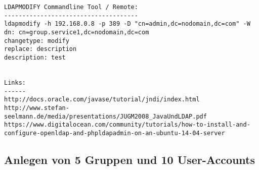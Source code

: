 \documentclass[letterpaper, 12pt]{article}
\let\tempsubsection\subsection
\renewcommand\subsection[1]{\vspace{0cm}\tempsubsection{#1}\vspace{0cm}}
\begin{document}
\newpage
\begin{lstlisting}[frame=single, caption=Grundkonfiguration]
LDAPMODIFY Commandline Tool / Remote:
-------------------------------------
ldapmodify -h 192.168.0.8 -p 389 -D "cn=admin,dc=nodomain,dc=com" -W  
dn: cn=group.service1,dc=nodomain,dc=com             
changetype: modify
replace: description
description: test


Links:
------
http://docs.oracle.com/javase/tutorial/jndi/index.html
http://www.stefan-seelmann.de/media/presentations/JUGM2008_JavaUndLDAP.pdf
https://www.digitalocean.com/community/tutorials/how-to-install-and-configure-openldap-and-phpldapadmin-on-an-ubuntu-14-04-server
\end{lstlisting}

\subsection{Anlegen von 5 Gruppen und 10 User-Accounts}
\newpage



\lstlistoflistings
\listoffigures
\end{document}
